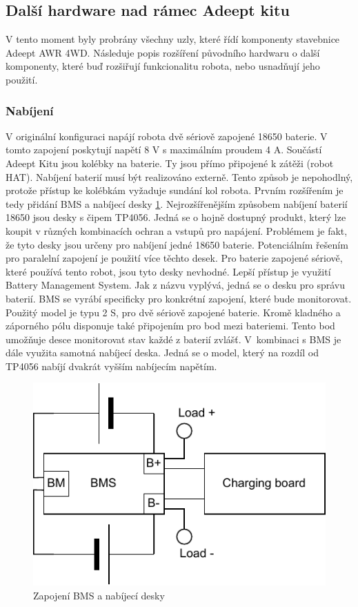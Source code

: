 \subsection*{Další hardware nad rámec Adeept kitu}
V tento moment byly probrány všechny uzly, které řídí komponenty stavebnice Adeept AWR 4WD. Následuje popis rozšíření původního hardwaru o další komponenty, které buď rozšiřují funkcionalitu robota, nebo usnadňují jeho použití.

\subsubsection*{Nabíjení}
V originální konfiguraci napájí robota dvě sériově zapojené 18650 baterie. V tomto zapojení poskytují napětí 8 V s maximálním proudem 4 A. Součástí Adeept Kitu jsou kolébky na baterie. Ty jsou přímo připojené k zátěži (robot HAT). Nabíjení baterií musí být realizováno externě. Tento způsob je nepohodlný, protože přístup ke kolébkám vyžaduje sundání kol robota. Prvním rozšířením je tedy přidání BMS a nabíjecí desky \ref{fig:battery}. 
Nejrozšířenějším způsobem nabíjení baterií 18650 jsou desky s čipem TP4056. Jedná se o hojně dostupný produkt, který lze koupit v různých kombinacích ochran a vstupů pro napájení. Problémem je fakt, že tyto desky jsou určeny pro nabíjení jedné 18650 baterie. Potenciálním řešením pro paralelní zapojení je použití více těchto desek. Pro baterie zapojené sériově, které používá tento robot, jsou tyto desky nevhodné.
Lepší přístup je využití Battery Management System. Jak z názvu vyplývá, jedná se o desku pro správu baterií. BMS se vyrábí specificky pro konkrétní zapojení, které bude monitorovat. Použitý model je typu 2 S, pro dvě sériově zapojené baterie. Kromě kladného a záporného pólu disponuje také připojením pro bod mezi bateriemi. Tento bod umožňuje desce monitorovat stav každé z baterií zvlášť.
V~kombinaci s BMS je dále využita samotná nabíjecí deska. Jedná se o model, který na rozdíl od TP4056 nabíjí dvakrát vyšším nabíjecím napětím.

\begin{figure}[h!]
	\centering
	\includegraphics[scale=0.75]{obrazky-figures/battery_circuite.pdf}
	\caption{Zapojení BMS a nabíjecí desky}
	\label{fig:battery}
\end{figure}


